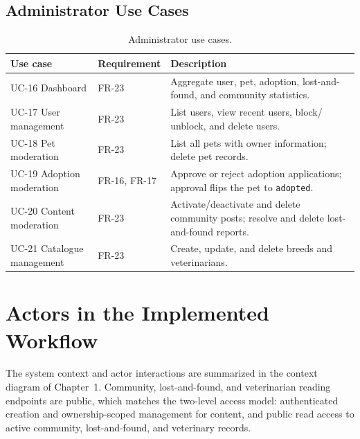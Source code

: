 \subsection{Administrator Use Cases}

\begin{center}
\begin{longtable}{@{}p{2.4cm}p{3.2cm}p{8.9cm}@{}}
\caption{Administrator use cases.}
\label{tab:uc-admin}\\
\toprule
\textbf{Use case} & \textbf{Requirement} & \textbf{Description} \\
\midrule
UC-16 Dashboard & FR-23 & Aggregate user, pet, adoption, lost-and-found, and
community statistics. \\
UC-17 User management & FR-23 & List users, view recent users, block/
unblock, and delete users. \\
UC-18 Pet moderation & FR-23 & List all pets with owner information; delete pet
records. \\
UC-19 Adoption moderation & FR-16, FR-17 & Approve or reject adoption
applications; approval flips the pet to \texttt{adopted}. \\
UC-20 Content moderation & FR-23 & Activate/deactivate and delete community
posts; resolve and delete lost-and-found reports. \\
UC-21 Catalogue management & FR-23 & Create, update, and delete breeds and
veterinarians. \\
\bottomrule
\end{longtable}
\end{center}

\section{Actors in the Implemented Workflow}

The system context and actor interactions are summarized in the context diagram
of Chapter~1. Community, lost-and-found, and veterinarian reading endpoints are
public, which matches the two-level access model: authenticated creation and
ownership-scoped management for content, and public read access to active
community, lost-and-found, and veterinary records.